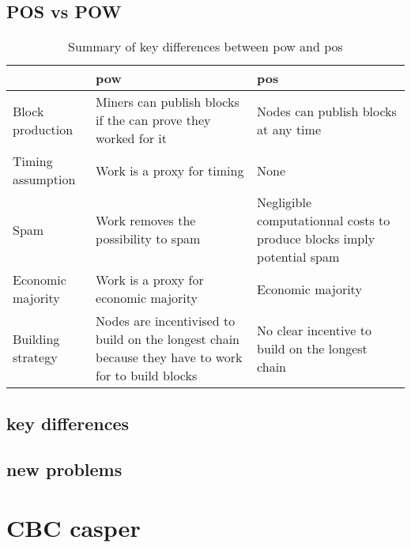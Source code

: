 
\subsection{POS vs POW}

\begin{table}[H]
    \centering
    {
        \begin{tabular}{|l|p{47mm}|p{47mm}|}
            \hline
            & \gls{pow} & \gls{pos} \\
            \hline
            Block production & Miners can publish blocks if the can prove they
            worked for it & Nodes can publish blocks at any time \\
            \hline
            Timing assumption & Work is a proxy for timing & None \\
            \hline
            Spam & Work removes the possibility to spam & Negligible
            computationnal costs to produce blocks imply potential spam \\
            \hline
            Economic majority & Work is a proxy for economic majority & Economic
            majority \\
            \hline
            Building strategy & Nodes are incentivised to build on the longest
            chain because they have to work for to build blocks & No clear
            incentive to build on the longest chain \\
            \hline
        \end{tabular}
        \captionsetup{justification=centering}
        \caption{Summary of key differences between \gls{pow} and \gls{pos}}
        \label{fig:keyDiffPowPos}
    }
\end{table}
\subsection{key differences}

\subsection{new problems}


\section{CBC casper}

